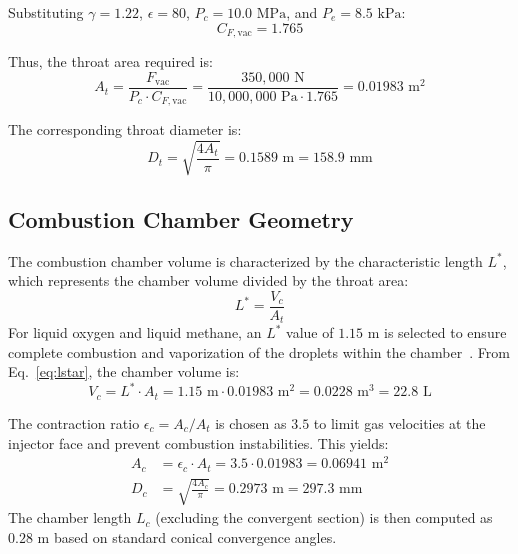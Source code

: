 Substituting $\gamma = 1.22$, $\epsilon = 80$, $P_c = 10.0\text{~MPa}$, and $P_e = 8.5\text{~kPa}$:
\begin{equation}
    C_{F,\text{vac}} = 1.765
\end{equation}

Thus, the throat area required is:
\begin{equation}
    A_t = \frac{F_{\text{vac}}}{P_c \cdot C_{F,\text{vac}}} = \frac{350{,}000 \text{~N}}{10{,}000{,}000 \text{~Pa} \cdot 1.765} = 0.01983 \text{~m}^2
\end{equation}

The corresponding throat diameter is:
\begin{equation}
    D_t = \sqrt{\frac{4 A_t}{\pi}} = 0.1589 \text{~m} = 158.9 \text{~mm}
\end{equation}

\subsection{Combustion Chamber Geometry}
The combustion chamber volume is characterized by the characteristic length $L^*$, which represents the chamber volume divided by the throat area:
\begin{equation}
    L^* = \frac{V_c}{A_t}
    \label{eq:lstar}
\end{equation}
For liquid oxygen and liquid methane, an $L^*$ value of $1.15\text{~m}$ is selected to ensure complete combustion and vaporization of the droplets within the chamber~\cite{Huzel1992}. From Eq.~\eqref{eq:lstar}, the chamber volume is:
\begin{equation}
    V_c = L^* \cdot A_t = 1.15 \text{~m} \cdot 0.01983 \text{~m}^2 = 0.0228 \text{~m}^3 = 22.8 \text{~L}
\end{equation}

The contraction ratio $\epsilon_c = A_c / A_t$ is chosen as $3.5$ to limit gas velocities at the injector face and prevent combustion instabilities. This yields:
\begin{align}
    A_c &= \epsilon_c \cdot A_t = 3.5 \cdot 0.01983 = 0.06941 \text{~m}^2 \\
    D_c &= \sqrt{\frac{4 A_c}{\pi}} = 0.2973 \text{~m} = 297.3 \text{~mm}
\end{align}
The chamber length $L_c$ (excluding the convergent section) is then computed as $0.28\text{~m}$ based on standard conical convergence angles.
